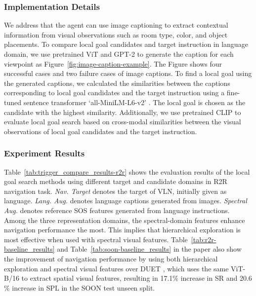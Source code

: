 \documentclass[10pt,twocolumn,letterpaper]{article}
\begin{document}
\subsubsection{Implementation Details}
We address that the agent can use image captioning to extract contextual information from visual observations such as room type, color, and object placements. To compare local goal candidates and target instruction in language domain, we use pretrained ViT \cite{dosovitskiy2020vit} and GPT-2 \cite{gpt2} to generate the caption for each viewpoint as Figure~\ref{fig:image-caption-example}. The Figure shows four successful cases and two failure cases of image captions. To find a local goal using the generated captions, we calculated the similarities between the captions corresponding to local goal candidates and the target instruction using a fine-tuned sentence transformer `all-MiniLM-L6-v2' \cite{reimers-2019-sentence-bert}. The local goal is chosen as the candidate with the highest similarity. Additionally, we use pretrained CLIP \cite{clip} to evaluate local goal search based on cross-modal similarities between the visual observations of local goal candidates and the target instruction. 

\subsubsection{Experiment Results}
Table~\ref{tab:trigger_compare_results-r2r} shows the evaluation results of the local goal search methods using different target and candidate domains in R2R navigation task. \textit{Nav. Target} denotes the target of VLN, initially given as language. \textit{Lang. Aug.} denotes language captions generated from images. \textit{Spectral Aug.} denotes reference SOS features generated from language instructions. Among the three representation domains, the spectral-domain features enhance navigation performance the most. This implies that hierarchical exploration is most effective when used with spectral visual features. Table~\ref{tab:r2r-baseline_results} and Table~\ref{tab:soon-baseline_results} in the paper also show the improvement of navigation performance by using both hierarchical exploration and spectral visual features over DUET \cite{chen2022thinkshort}, which uses the same ViT-B/16 to extract spatial visual features, resulting in 17.1$\%$ increase in SR and 20.6$\%$ increase in SPL in the SOON test unseen split.
\end{document}
